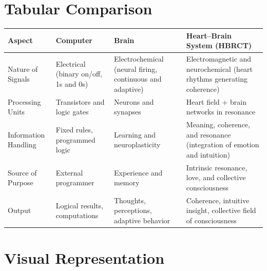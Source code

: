 \documentclass[12pt]{article}
\begin{document}
\section*{Tabular Comparison}

\begin{tabular}{>{\raggedright\arraybackslash}p{3cm} 
                >{\raggedright\arraybackslash}p{4cm} 
                >{\raggedright\arraybackslash}p{4cm} 
                >{\raggedright\arraybackslash}p{4cm}}
\toprule
\textbf{Aspect} & \textbf{Computer} & \textbf{Brain} & \textbf{Heart--Brain System (HBRCT)} \\
\midrule
Nature of Signals 
& Electrical (binary on/off, 1s and 0s) 
& Electrochemical (neural firing, continuous and adaptive) 
& Electromagnetic and neurochemical (heart rhythms generating coherence) \\
\midrule
Processing Units 
& Transistors and logic gates 
& Neurons and synapses 
& Heart field + brain networks in resonance \\
\midrule
Information Handling 
& Fixed rules, programmed logic 
& Learning and neuroplasticity 
& Meaning, coherence, and resonance (integration of emotion and intuition) \\
\midrule
Source of Purpose 
& External programmer 
& Experience and memory 
& Intrinsic resonance, love, and collective consciousness \\
\midrule
Output 
& Logical results, computations 
& Thoughts, perceptions, adaptive behavior 
& Coherence, intuitive insight, collective field of consciousness \\
\bottomrule
\end{tabular}

\section*{Visual Representation}
\end{document}
